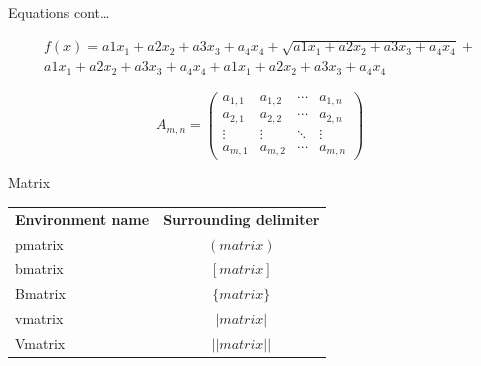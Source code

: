 \documentclass[10pt,times]{beamer}
\begin{document}
\begin{frame}{Equations cont\dots}

\begin{multline}
f(x)=a1x_1+a2x_2+a3x_3+a_4x_4+
\sqrt{a1x_1+a2x_2+a3x_3+a_4x_4}+\\
a1x_1+a2x_2+a3x_3+a_4x_4+
a1x_1+a2x_2+a3x_3+a_4x_4
\end{multline}

\begin{equation}
A_{m,n} =
 \begin{pmatrix}
  a_{1,1} & a_{1,2} & \cdots & a_{1,n} \\
  a_{2,1} & a_{2,2} & \cdots & a_{2,n} \\
  \vdots  & \vdots  & \ddots & \vdots  \\
  a_{m,1} & a_{m,2} & \cdots & a_{m,n}
 \end{pmatrix}
\end{equation}
\end{frame}

\begin{frame}{Matrix}
\begin{center}
\begin{tabular}{l c}
\textbf{Environment name} &	\textbf{Surrounding delimiter} \\
pmatrix	& $( matrix )$  \\
bmatrix	&	$[ matrix ]$  \\
Bmatrix	&	$\{ matrix \}$ \\
vmatrix	&	$| matrix |$ \\
Vmatrix &	$|| matrix ||$  \\
\end{tabular}
\end{center}
\end{frame}

\end{document}
